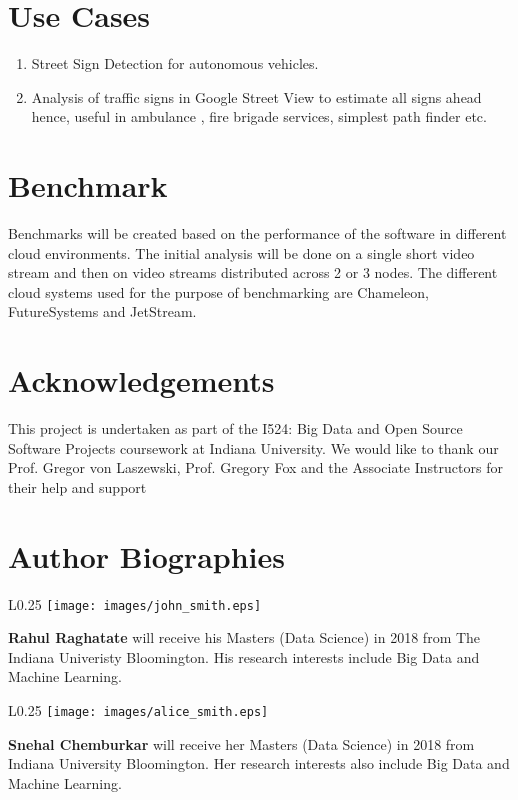 \documentclass[9pt,twocolumn,twoside]{../../styles/osajnl}
\begin{document}
\section{Use Cases}
\begin{enumerate}
\item Street Sign Detection for autonomous vehicles.
\item Analysis of traffic signs in Google Street View to estimate all
  signs ahead hence, useful in ambulance , fire brigade services,
  simplest path finder etc.
\end{enumerate}

\section{Benchmark}
Benchmarks will be created based on the performance of the software in
different cloud environments. The initial analysis will be done on a
single short video stream and then on video streams distributed across
2 or 3 nodes. The different cloud systems used for the purpose of
benchmarking are Chameleon, FutureSystems and JetStream.



\section*{Acknowledgements}
This project is undertaken as part of the I524: Big Data and Open
Source Software Projects coursework at Indiana University. We would
like to thank our Prof. Gregor von Laszewski, Prof. Gregory Fox and
the Associate Instructors for their help and support



\section*{Author Biographies}
\begingroup \setlength\intextsep{0pt}
\begin{minipage}[t][3.2cm][t]{1.0\columnwidth}
  \begin{wrapfigure}{L}{0.25\columnwidth}
    \texttt{[image: images/john\_smith.eps]}
  \end{wrapfigure}
  \noindent
  {\bfseries Rahul Raghatate} will receive his Masters (Data Science)
  in 2018 from The Indiana Univeristy Bloomington. His research
  interests include Big Data and Machine Learning.
\end{minipage}
\begin{minipage}[t][3.2cm][t]{1.0\columnwidth} %
  \begin{wrapfigure}{L}{0.25\columnwidth}
    \texttt{[image: images/alice\_smith.eps]}
  \end{wrapfigure}
  \noindent
  {\bfseries Snehal Chemburkar} will receive her Masters (Data
  Science) in 2018 from Indiana University Bloomington. Her research
  interests also include Big Data and Machine Learning.
\end{minipage}
\endgroup
\newpage
\end{document}
